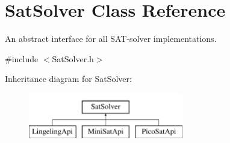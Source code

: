 \hypertarget{classSatSolver}{\section{Sat\-Solver Class Reference}
\label{classSatSolver}
}


An abstract interface for all S\-A\-T-\/solver implementations.  




{\ttfamily \#include $<$Sat\-Solver.\-h$>$}

Inheritance diagram for Sat\-Solver\-:\begin{figure}[H]
\begin{center}
\leavevmode
\includegraphics[height=2.000000cm]{classSatSolver}
\end{center}
\end{figure}
